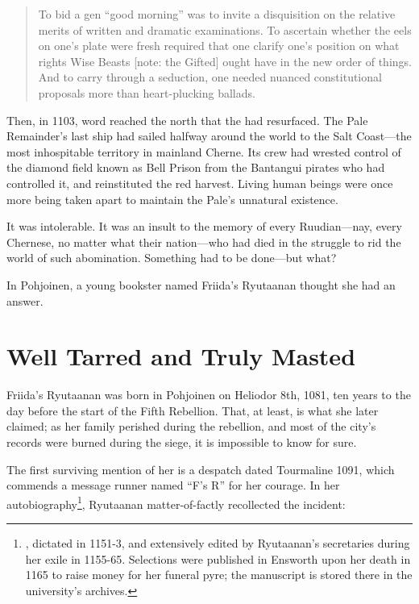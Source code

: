 \documentclass[12pt]{report}
\begin{document}
\begin{quotation}
To bid a gen ``good morning'' was to invite a disquisition on the
relative merits of written and dramatic examinations.  To ascertain
whether the eels on one's plate were fresh required that one clarify
one's position on what rights Wise Beasts [note: the Gifted] ought
have in the new order of things.  And to carry through a seduction,
one needed nuanced constitutional proposals more than heart-plucking
ballads.
\end{quotation}

Then, in 1103, word reached the north that the 
had resurfaced.  The Pale Remainder's last ship had sailed halfway
around the world to the Salt Coast---the most inhospitable territory
in mainland Cherne.  Its crew had wrested control of the diamond field
known as Bell Prison from the Bantangui pirates who had controlled it,
and reinstituted the red harvest.  Living human beings were once more
being taken apart to maintain the Pale's unnatural existence.

It was intolerable.  It was an insult to the memory of every
Ruudian---nay, every Chernese, no matter what their nation---who had
died in the struggle to rid the world of such abomination.  Something
had to be done---but what?

In Pohjoinen, a young bookster named Friida's Ryutaanan thought she
had an answer.

\chapter{Well Tarred and Truly Masted}

Friida's Ryutaanan was born in Pohjoinen on Heliodor 8th, 1081, ten
years to the day before the start of the Fifth Rebellion.  That, at
least, is what she later claimed; as her family perished during the
rebellion, and most of the city's records were burned during the
siege, it is impossible to know for sure.

The first surviving mention of her is a despatch dated Tourmaline
1091, which commends a message runner named ``F's R'' for her courage.
In her autobiography\footnote{,
dictated in 1151-3, and extensively edited by Ryutaanan's secretaries
during her exile in 1155-65.  Selections were published in Ensworth
upon her death in 1165 to raise money for her funeral pyre; the
manuscript is stored there in the university's archives.}, Ryutaanan
matter-of-factly recollected the incident:
\end{document}

